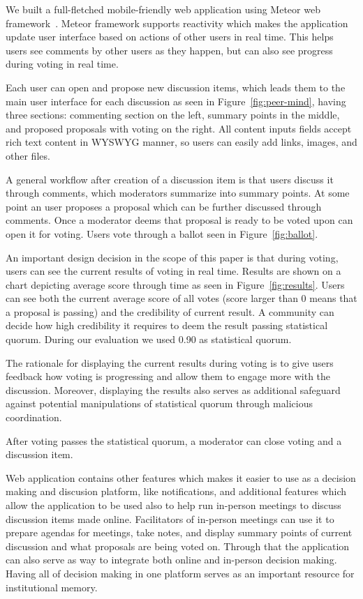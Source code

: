 \documentclass[format=acmsmall, review=true, screen=true, anonymous=true]{acmart}
\begin{document}
We built a full-fletched mobile-friendly web application using Meteor web framework~\cite{meteor}.
Meteor framework supports reactivity which makes the application update user interface based on actions
of other users in real time. This helps users see comments by other users as they happen, but can also see
progress during voting in real time.

Each user can open and propose new discussion items, which leads them to the main user interface for each discussion as seen in Figure~\ref{fig:peer-mind}, having three sections: commenting section on the left, summary points in the middle,
and proposed proposals with voting on the right. All content inputs fields accept rich text content in WYSWYG manner,
so users can easily add links, images, and other files.

A general workflow after creation of a discussion item is that users discuss it through comments,
which moderators summarize into summary points. At some point an user proposes a proposal which can be
further discussed through comments. Once a moderator deems that proposal is ready to be voted upon
can open it for voting. Users vote through a ballot seen in Figure~\ref{fig:ballot}.

An important design decision in the scope of this paper is that during voting, users can see the current
results of voting in real time. Results are shown on a chart depicting average score through time
as seen in Figure~\ref{fig:results}. Users can see both the current average score of all votes (score
larger than 0 means that a proposal is passing) and the credibility of current result. A community can decide
how high credibility it requires to deem the result passing statistical quorum. During our evaluation
we used 0.90 as statistical quorum.

The rationale for displaying the current results during voting is to give users feedback how voting
is progressing and allow them to engage more with the discussion. Moreover, displaying the results
also serves as additional safeguard against potential manipulations of statistical quorum through malicious
coordination.

After voting passes the statistical quorum, a moderator can close voting and a discussion item.

Web application contains other features which makes it easier to use as a decision making and discusion
platform, like notifications, and additional features which allow the application to be used also to
help run in-person meetings to discuss discussion items made
online. Facilitators of in-person meetings can use it to prepare agendas for meetings, take notes,
and display summary points of current discussion and what proposals are being voted on. Through that the
application can also serve as way to integrate both online and in-person decision making. Having all of
decision making in one platform serves as an important resource for institutional memory.
\end{document}
